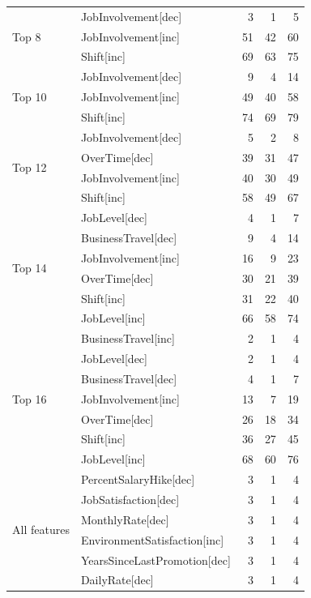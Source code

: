 \documentclass[a4paper,fleqn]{cas-sc}
\begin{document}
{\begin{longtable}{llrrr}
\multirow{3}{*}{Top 8}  & JobInvolvement[dec] & 3  & 1  & 5  \\
  & JobInvolvement[inc] & 51 & 42 & 60 \\
  & Shift[inc]          & 69 & 63 & 75 \\
\midrule
\multirow{3}{*}{Top 10} & JobInvolvement[dec] & 9  & 4  & 14 \\
 & JobInvolvement[inc] & 49 & 40 & 58 \\
 & Shift[inc]          & 74 & 69 & 79 \\
\midrule
\multirow{4}{*}{Top 12} & JobInvolvement[dec] & 5  & 2  & 8  \\
 & OverTime[dec]       & 39 & 31 & 47 \\
 & JobInvolvement[inc] & 40 & 30 & 49 \\
 & Shift[inc]          & 58 & 49 & 67 \\
\midrule
\multirow{6}{*}{Top 14} & JobLevel[dec]       & 4  & 1  & 7  \\
 & BusinessTravel[dec] & 9  & 4  & 14 \\
 & JobInvolvement[inc] & 16 & 9  & 23 \\
 & OverTime[dec]       & 30 & 21 & 39 \\
 & Shift[inc]          & 31 & 22 & 40 \\
 & JobLevel[inc]       & 66 & 58 & 74 \\
\midrule
\multirow{7}{*}{Top 16} & BusinessTravel[inc] & 2  & 1  & 4  \\
 & JobLevel[dec]       & 2  & 1  & 4  \\
 & BusinessTravel[dec] & 4  & 1  & 7  \\
 & JobInvolvement[inc] & 13 & 7  & 19 \\
 & OverTime[dec]       & 26 & 18 & 34 \\
 & Shift[inc]          & 36 & 27 & 45 \\
 & JobLevel[inc]       & 68 & 60 & 76 \\
\midrule
\multirow{19}{*}{All features} & PercentSalaryHike[dec]        & 3  & 1  & 4  \\
 & JobSatisfaction[dec]          & 3  & 1  & 4  \\
 & MonthlyRate[dec]              & 3  & 1  & 4  \\
 & EnvironmentSatisfaction[inc]  & 3  & 1  & 4  \\
 & YearsSinceLastPromotion[dec]  & 3  & 1  & 4  \\
 & DailyRate[dec]                & 3  & 1  & 4  \\

\end{longtable}}
\end{document}
